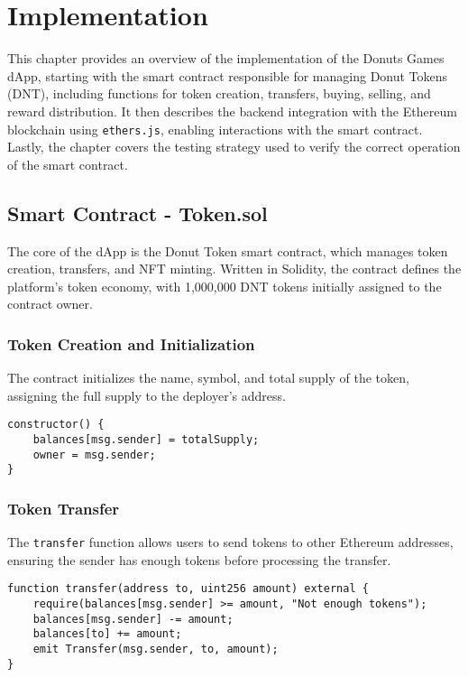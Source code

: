 \documentclass[../main.tex]{subfiles}
\begin{document}
\section{Implementation}\label{sec:implementation}

This chapter provides an overview of the implementation of the Donuts Games dApp, starting with the smart contract responsible for managing Donut Tokens (DNT), including functions for token creation, transfers, buying, selling, and reward distribution. It then describes the backend integration with the Ethereum blockchain using \texttt{ethers.js}, enabling interactions with the smart contract. Lastly, the chapter covers the testing strategy used to verify the correct operation of the smart contract.


\subsection{Smart Contract - Token.sol}
The core of the dApp is the Donut Token smart contract, which manages token creation, transfers, and NFT minting. Written in Solidity, the contract defines the platform’s token economy, with 1,000,000 DNT tokens initially assigned to the contract owner.

\subsubsection{Token Creation and Initialization}
The contract initializes the name, symbol, and total supply of the token, assigning the full supply to the deployer's address. 

\begin{verbatim}
constructor() {
    balances[msg.sender] = totalSupply;
    owner = msg.sender;
}
\end{verbatim}

\subsubsection{Token Transfer}
The \texttt{transfer} function allows users to send tokens to other Ethereum addresses, ensuring the sender has enough tokens before processing the transfer.

\begin{verbatim}
function transfer(address to, uint256 amount) external {
    require(balances[msg.sender] >= amount, "Not enough tokens");
    balances[msg.sender] -= amount;
    balances[to] += amount;
    emit Transfer(msg.sender, to, amount);
}
\end{verbatim}
\end{document}
